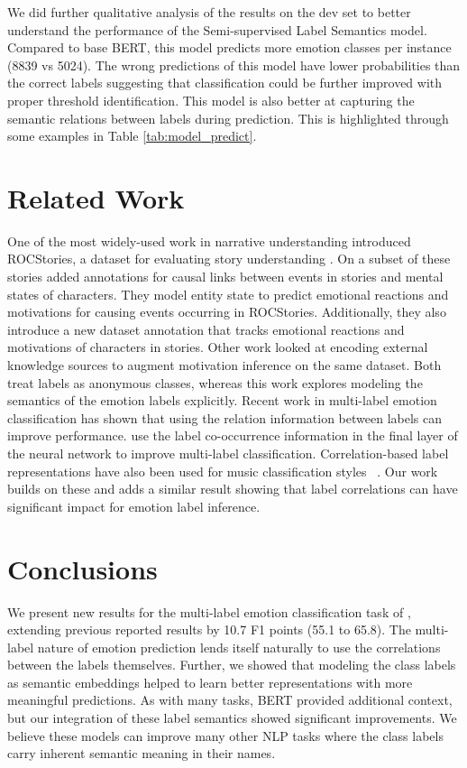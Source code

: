 \documentclass[11pt,a4paper]{article}
\newcommand{\nb}[1]{\textcolor{blue}{[NB: #1]}}
\newcommand{\eat}[1]{}
\begin{document}
We did further qualitative analysis of the results on the dev set to better understand the performance of the Semi-supervised Label Semantics model. Compared to base BERT, this model predicts more emotion classes per instance (8839 vs 5024). \eat{The distinction between the correct and incorrect labels are much higher than the simple BERT model, which highlights the higher confidence in predictions. and more correct emotion classes per instance (4421 vs 3665), and has fewer semantically opposite predictions to ground truth \nb{( vs )}}
The wrong predictions of this model have lower probabilities than the correct labels suggesting that classification could be further improved with proper threshold identification. This model is also better at capturing the semantic relations between labels during prediction. This is highlighted through some examples in Table \ref{tab:model_predict}.

 \section{Related Work}
One of the most widely-used work in narrative understanding introduced ROCStories, a dataset for evaluating story understanding \cite{mostafazadeh2016corpus}. On a subset of these stories \cite{rashkin2018modeling} added annotations for causal links between events in stories and mental states of characters. They model entity state to predict emotional reactions and motivations for causing events occurring in ROCStories. Additionally, they also introduce a new dataset annotation that tracks emotional reactions and motivations of characters in stories. Other work looked at encoding external knowledge sources to augment motivation inference \cite{paulfrank:2019} on the same dataset. Both treat labels as anonymous classes, whereas this work explores modeling the semantics of the emotion labels explicitly.
Recent work in multi-label emotion classification has shown that using the relation information between labels can improve performance.
\cite{kurata2016improved} use the label co-occurrence information in the final layer of the neural network to improve multi-label classification. Correlation-based label representations have also been used for music classification styles ~\cite{zhao-etal-2019-review}. Our work builds on these and adds a similar result showing that label correlations can have significant impact for emotion label inference. \section{Conclusions}
We present new results for the multi-label emotion classification task of \citet{rashkin2018modeling}, extending previous reported results by 10.7 F1 points (55.1 to 65.8). 
The multi-label nature of emotion prediction  lends itself naturally to use the correlations between the labels themselves. 
Further, we showed that modeling the class labels as semantic embeddings helped to learn better representations with more meaningful predictions.
As with many tasks, BERT provided additional context, but our integration of these label semantics showed significant improvements.
We believe these models can improve many other NLP tasks where the class labels carry inherent semantic meaning in their names.
\end{document}
